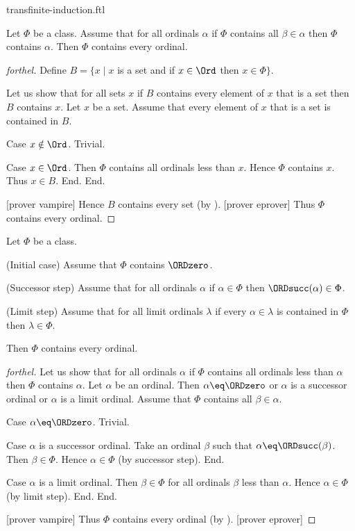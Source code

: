 \documentclass{naproche-library}
\begin{document}
\begin{smodule}[title=Transfinite Induction]{transfinite-induction.ftl}

\begin{theorem}[forthel,id=SET_THEORY_02_8493935460614144]
  Let $\Phi$ be a class.
  Assume that for all ordinals $\alpha$ if $\Phi$ contains all $\beta \in \alpha$ then $\Phi$ contains $\alpha$.
  Then $\Phi$ contains every ordinal.
\end{theorem}
\begin{proof}[forthel]
  Define $B = \{ x \mid x$ is a set and if $x \in \Ord$ then $x \in \Phi \}$.

  Let us show that for all sets $x$ if $B$ contains every element of $x$ that is a set then $B$ contains $x$.
    Let $x$ be a set.
    Assume that every element of $x$ that is a set is contained in $B$.

    Case $x \notin \Ord$. Trivial.

    Case $x \in \Ord$.
      Then $\Phi$ contains all ordinals less than $x$.
      Hence $\Phi$ contains $x$.
      Thus $x \in B$.
    End.
  End.

  [prover vampire]
  Hence $B$ contains every set (by ).
  [prover eprover]
  Thus $\Phi$ contains every ordinal.
\end{proof}

\begin{theorem}[forthel,id=SET_THEORY_02_7892040431960064]
  Let $\Phi$ be a class.
  
  (Initial case) Assume that $\Phi$ contains $\ORDzero$.
  
  (Successor step) Assume that for all ordinals $\alpha$ if $\alpha \in \Phi$ then $\ORDsucc(\alpha) \in \Phi$.
  
  (Limit step) Assume that for all limit ordinals $\lambda$ if every $\alpha \in \lambda$ is contained in $\Phi$ then $\lambda \in \Phi$.
  
  Then $\Phi$ contains every ordinal.
\end{theorem}
\begin{proof}[forthel]
  Let us show that for all ordinals $\alpha$ if $\Phi$ contains all ordinals
  less than $\alpha$ then $\Phi$ contains $\alpha$.
    Let $\alpha$ be an ordinal.
    Then $\alpha \eq \ORDzero$ or $\alpha$ is a successor ordinal or $\alpha$ is a
    limit ordinal.
    Assume that $\Phi$ contains all $\beta \in \alpha$.

    Case $\alpha \eq \ORDzero$. Trivial.

    Case $\alpha$ is a successor ordinal.
      Take an ordinal $\beta$ such that $\alpha \eq \ORDsucc(\beta)$.
      Then $\beta \in \Phi$.
      Hence $\alpha \in \Phi$ (by successor step).
    End.

    Case $\alpha$ is a limit ordinal.
      Then $\beta \in \Phi$ for all ordinals $\beta$ less than $\alpha$.
      Hence $\alpha \in \Phi$ (by limit step).
    End.
  End.

  [prover vampire]
  Thus $\Phi$ contains every ordinal (by ).
  [prover eprover]
\end{proof}
\end{smodule}
\end{document}
